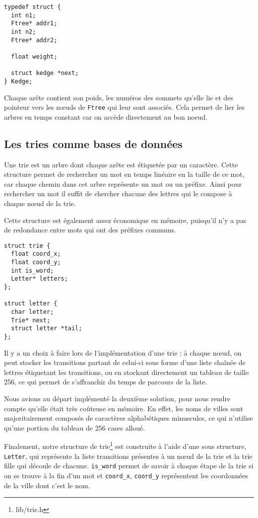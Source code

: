 \documentclass[a4paper]{article}
\begin{document}
\begin{verbatim}
typedef struct {
  int n1;
  Ftree* addr1;
  int n2;
  Ftree* addr2;

  float weight;

  struct kedge *next;
} Kedge;
\end{verbatim}

Chaque arête contient son poids, les numéros des sommets qu'elle lie et des pointeur vers les nœuds de \texttt{Ftree} qui leur sont associés. Cela permet de lier les arbres en temps constant car on accède directement au bon noeud.

\subsection{Les tries comme bases de données}

Une trie est un arbre dont chaque arête est étiquetée par un caractère. Cette structure permet de rechercher un mot en temps linéaire en la taille de ce mot, car chaque chemin dans cet arbre représente un mot ou un préfixe. Ainsi pour rechercher un mot il suffit de chercher chacune des lettres qui le compose à chaque nœud de la trie.

Cette structure est également assez économique en mémoire, puisqu'il n'y a pas de redondance entre mots qui ont des préfixes communs.

\begin{verbatim}
struct trie {
  float coord_x;
  float coord_y;
  int is_word;
  Letter* letters;
};

struct letter {
  char letter;
  Trie* next;
  struct letter *tail;
};
\end{verbatim}

Il y a un choix à faire lors de l'implémentation d'une trie : à chaque nœud, on peut stocker les transitions partant de celui-ci sous forme d'une liste chaînée de lettres étiquetant les transitions, ou en stockant directement un tableau de taille 256, ce qui permet de s'affranchir du temps de parcours de la liste.

Nous avions au départ implémenté la deuxième solution, pour nous rendre compte qu'elle était très coûteuse en mémoire. En effet, les noms de villes sont majoritairement composés de caractères alphabétiques minuscules, ce qui n'utilise qu'une portion du tableau de 256 cases alloué.

Finalement, notre structure de trie\footnote{lib/trie.h} est construite à l'aide d'une sous structure, \texttt{Letter}, qui représente la liste transitions présentes à un nœud de la trie et la trie fille qui découle de chacune. \texttt{is\_word} permet de savoir à chaque étape de la trie si on se trouve à la fin d'un mot et \texttt{coord\_x}, \texttt{coord\_y} représentent les coordonnées de la ville dont c'est le nom.
\end{document}
